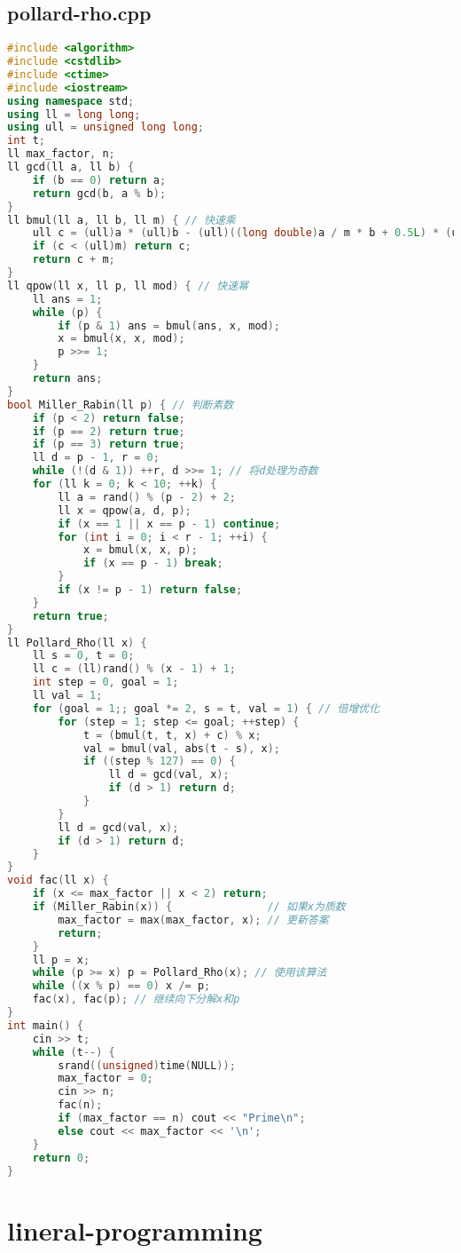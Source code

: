 \documentclass[9pt, a4paper, oneside]{book}
\begin{document}
\subsection{pollard-rho.cpp}
\begin{lstlisting}[language={C++}]
#include <algorithm>
#include <cstdlib>
#include <ctime>
#include <iostream>
using namespace std;
using ll = long long;
using ull = unsigned long long;
int t;
ll max_factor, n;
ll gcd(ll a, ll b) {
    if (b == 0) return a;
    return gcd(b, a % b);
}
ll bmul(ll a, ll b, ll m) { // 快速乘
    ull c = (ull)a * (ull)b - (ull)((long double)a / m * b + 0.5L) * (ull)m;
    if (c < (ull)m) return c;
    return c + m;
}
ll qpow(ll x, ll p, ll mod) { // 快速幂
    ll ans = 1;
    while (p) {
        if (p & 1) ans = bmul(ans, x, mod);
        x = bmul(x, x, mod);
        p >>= 1;
    }
    return ans;
}
bool Miller_Rabin(ll p) { // 判断素数
    if (p < 2) return false;
    if (p == 2) return true;
    if (p == 3) return true;
    ll d = p - 1, r = 0;
    while (!(d & 1)) ++r, d >>= 1; // 将d处理为奇数
    for (ll k = 0; k < 10; ++k) {
        ll a = rand() % (p - 2) + 2;
        ll x = qpow(a, d, p);
        if (x == 1 || x == p - 1) continue;
        for (int i = 0; i < r - 1; ++i) {
            x = bmul(x, x, p);
            if (x == p - 1) break;
        }
        if (x != p - 1) return false;
    }
    return true;
}
ll Pollard_Rho(ll x) {
    ll s = 0, t = 0;
    ll c = (ll)rand() % (x - 1) + 1;
    int step = 0, goal = 1;
    ll val = 1;
    for (goal = 1;; goal *= 2, s = t, val = 1) { // 倍增优化
        for (step = 1; step <= goal; ++step) {
            t = (bmul(t, t, x) + c) % x;
            val = bmul(val, abs(t - s), x);
            if ((step % 127) == 0) {
                ll d = gcd(val, x);
                if (d > 1) return d;
            }
        }
        ll d = gcd(val, x);
        if (d > 1) return d;
    }
}
void fac(ll x) {
    if (x <= max_factor || x < 2) return;
    if (Miller_Rabin(x)) {               // 如果x为质数
        max_factor = max(max_factor, x); // 更新答案
        return;
    }
    ll p = x;
    while (p >= x) p = Pollard_Rho(x); // 使用该算法
    while ((x % p) == 0) x /= p;
    fac(x), fac(p); // 继续向下分解x和p
}
int main() {
    cin >> t;
    while (t--) {
        srand((unsigned)time(NULL));
        max_factor = 0;
        cin >> n;
        fac(n);
        if (max_factor == n) cout << "Prime\n";
        else cout << max_factor << '\n';
    }
    return 0;
}\end{lstlisting}
\section{lineral-programming}
\end{document}
